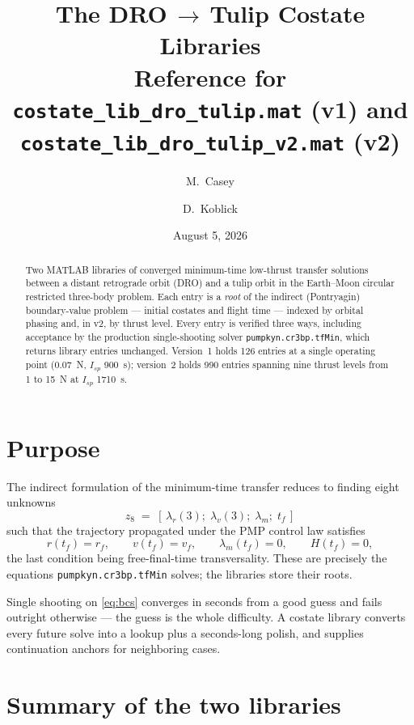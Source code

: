 \documentclass[11pt]{article}
\title{The DRO\,$\rightarrow$\,Tulip Costate Libraries\\
\large Reference for \texttt{costate\_lib\_dro\_tulip.mat} (v1) and
\texttt{costate\_lib\_dro\_tulip\_v2.mat} (v2)}
\author{M.~Casey \and D.~Koblick}
\date{August 5, 2026}
\begin{document}
\maketitle

\begin{abstract}
Two MATLAB libraries of converged minimum-time low-thrust transfer solutions
between a distant retrograde orbit (DRO) and a tulip orbit in the Earth--Moon
circular restricted three-body problem. Each entry is a \emph{root} of the
indirect (Pontryagin) boundary-value problem --- initial costates and flight
time --- indexed by orbital phasing and, in v2, by thrust level. Every entry
is verified three ways, including acceptance by the production single-shooting
solver \texttt{pumpkyn.cr3bp.tfMin}, which returns library entries unchanged.
Version~1 holds 126 entries at a single operating point (0.07~N, $I_{sp}$
900~s); version~2 holds 990 entries spanning nine thrust levels from 1 to
15~N at $I_{sp}$ 1710~s.
\end{abstract}

\section{Purpose}

The indirect formulation of the minimum-time transfer reduces to finding eight
unknowns
\begin{equation}
z_8 \;=\; [\,\lambda_r(3);\;\lambda_v(3);\;\lambda_m;\;t_f\,]
\end{equation}
such that the trajectory propagated under the PMP control law satisfies
\begin{equation}
r(t_f) = r_f,\qquad v(t_f) = v_f,\qquad \lambda_m(t_f) = 0,\qquad H(t_f) = 0,
\label{eq:bcs}
\end{equation}
the last condition being free-final-time transversality. These are precisely
the equations \texttt{pumpkyn.cr3bp.tfMin} solves; the libraries store their
roots.

Single shooting on \eqref{eq:bcs} converges in seconds from a good guess and
fails outright otherwise --- the guess is the whole difficulty. A costate
library converts every future solve into a lookup plus a seconds-long polish,
and supplies continuation anchors for neighboring cases.

\section{Summary of the two libraries}
\end{document}
